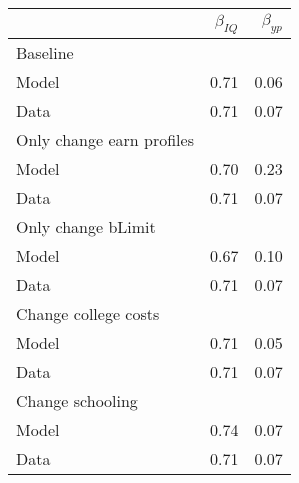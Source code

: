 \begin{tabular}{lrr}
\hline
  & $\beta_{IQ}$  & $\beta_{yp}$  \\
\hline
Baseline &   &   \\
Model & 0.71  & 0.06  \\
Data & 0.71  & 0.07  \\
Only change earn profiles &   &   \\
Model & 0.70  & 0.23  \\
Data & 0.71  & 0.07  \\
Only change bLimit &   &   \\
Model & 0.67  & 0.10  \\
Data & 0.71  & 0.07  \\
Change college costs &   &   \\
Model & 0.71  & 0.05  \\
Data & 0.71  & 0.07  \\
Change schooling &   &   \\
Model & 0.74  & 0.07  \\
Data & 0.71  & 0.07  \\
\hline
\end{tabular}%

